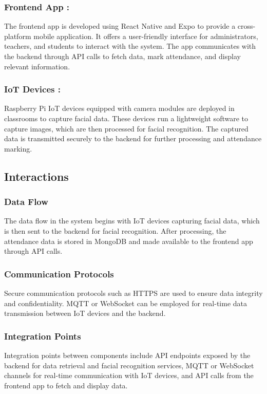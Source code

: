 \documentclass[conference]{IEEEtran}
\begin{document}
\subsubsection{\textbf{Frontend App :}}
The frontend app is developed using React Native and Expo to provide a cross-platform mobile application. It offers a user-friendly interface for administrators, teachers, and students to interact with the system. The app communicates with the backend through API calls to fetch data, mark attendance, and display relevant information.

\subsubsection{\textbf{IoT Devices :}}
Raspberry Pi IoT devices equipped with camera modules are deployed in classrooms to capture facial data. These devices run a lightweight software to capture images, which are then processed for facial recognition. The captured data is transmitted securely to the backend for further processing and attendance marking.

\subsection{Interactions}
\subsubsection{Data Flow}
The data flow in the system begins with IoT devices capturing facial data, which is then sent to the backend for facial recognition. After processing, the attendance data is stored in MongoDB and made available to the frontend app through API calls.

\subsubsection{Communication Protocols}
Secure communication protocols such as HTTPS are used to ensure data integrity and confidentiality. MQTT or WebSocket can be employed for real-time data transmission between IoT devices and the backend.

\subsubsection{Integration Points}
Integration points between components include API endpoints exposed by the backend for data retrieval and facial recognition services, MQTT or WebSocket channels for real-time communication with IoT devices, and API calls from the frontend app to fetch and display data.
\end{document}
